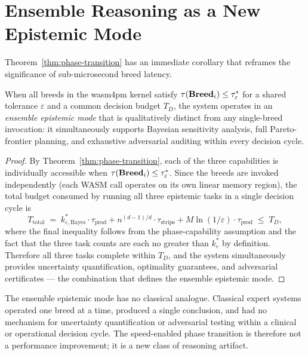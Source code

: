 \section{Ensemble Reasoning as a New Epistemic Mode}
\label{sec:ensemble-epistemic-mode}

Theorem~\ref{thm:phase-transition} has an immediate corollary that reframes the
significance of sub-microsecond breed latency.

\begin{corollary}
\label{cor:ensemble-mode}
When all breeds in the wasm4pm kernel satisfy $\tau(\mathbf{Breed}_i) \leq \tau^*_\varepsilon$ for
a shared tolerance $\varepsilon$ and a common decision budget $T_D$, the system operates
in an \emph{ensemble epistemic mode} that is qualitatively distinct from any single-breed
invocation: it simultaneously supports Bayesian sensitivity analysis, full Pareto-frontier
planning, and exhaustive adversarial auditing within every decision cycle.
\end{corollary}

\begin{proof}
By Theorem~\ref{thm:phase-transition}, each of the three capabilities is individually
accessible when $\tau(\mathbf{Breed}_i) \leq \tau^*_\varepsilon$.  Since the breeds are invoked
independently (each WASM call operates on its own linear memory region), the total budget
consumed by running all three epistemic tasks in a single decision cycle is
\[
  T_{\text{total}} \;=\;
    k^*_{\varepsilon,\text{Bayes}} \cdot \tau_{\text{prod}} +
    n^{(d-1)/d} \cdot \tau_{\text{strips}} +
    M \ln(1/\varepsilon) \cdot \tau_{\text{prod}}
  \;\leq\; T_D,
\]
where the final inequality follows from the phase-capability assumption and the fact that
the three task counts are each no greater than $k^*_\varepsilon$ by definition.
Therefore all three tasks complete within $T_D$, and the system simultaneously provides
uncertainty quantification, optimality guarantees, and adversarial certificates --- the
combination that defines the ensemble epistemic mode.
\end{proof}

The ensemble epistemic mode has no classical analogue.  Classical expert systems operated
one breed at a time, produced a single conclusion, and had no mechanism for
uncertainty quantification or adversarial testing within a clinical or operational
decision cycle.  The speed-enabled phase transition is therefore not a performance
improvement; it is a new class of reasoning artifact.

